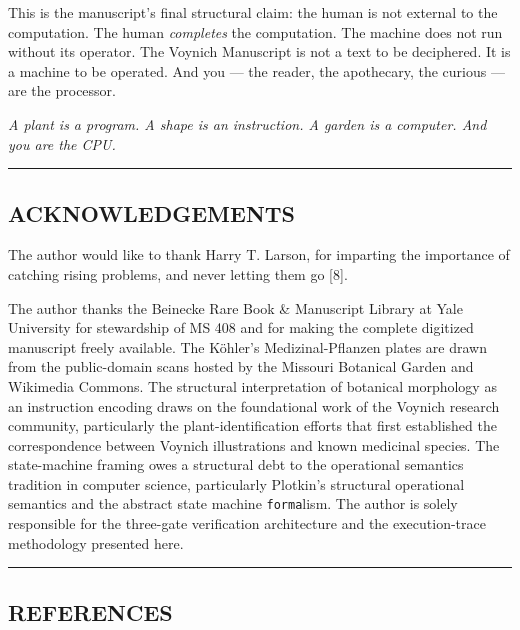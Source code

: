 \documentclass[12pt,a4paper]{article}
\begin{document}
This is the manuscript's final structural claim: the human is not
external to the computation. The human \emph{completes} the computation.
The machine does not run without its operator. The Voynich Manuscript is
not a text to be deciphered. It is a machine to be operated. And you ---
the reader, the apothecary, the curious --- are the processor.

\emph{A plant is a program. A shape is an instruction. A garden is a
computer. And you are the CPU.}

\begin{center}\rule{0.5\linewidth}{0.5pt}\end{center}

\hypertarget{acknowledgements}{%
\subsection{ACKNOWLEDGEMENTS}\label{acknowledgements}}

The author would like to thank Harry T. Larson, for imparting the
importance of catching rising problems, and never letting them go
{[}8{]}.

The author thanks the Beinecke Rare Book \& Manuscript Library at Yale
University for stewardship of MS 408 and for making the complete
digitized manuscript freely available. The Köhler's Medizinal-Pflanzen
plates are drawn from the public-domain scans hosted by the Missouri
Botanical Garden and Wikimedia Commons. The structural interpretation of
botanical morphology as an instruction encoding draws on the
foundational work of the Voynich research community, particularly the
plant-identification efforts that first established the correspondence
between Voynich illustrations and known medicinal species. The
state-machine framing owes a structural debt to the operational
semantics tradition in computer science, particularly Plotkin's
structural operational semantics and the abstract state machine
\texttt{forma}lism. The author is solely responsible for the three-gate
verification architecture and the execution-trace methodology presented
here.

\begin{center}\rule{0.5\linewidth}{0.5pt}\end{center}

\hypertarget{references}{%
\subsection{REFERENCES}\label{references}}
\end{document}
